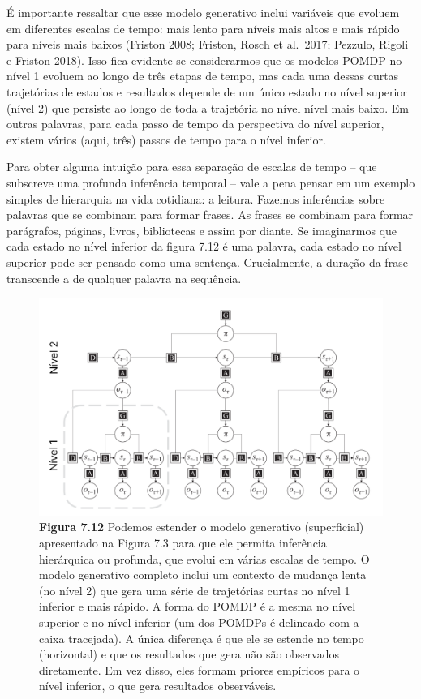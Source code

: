 \documentclass[
  12pt,
]{book}
\begin{document}
É importante ressaltar que esse modelo generativo inclui variáveis que evoluem em diferentes escalas de tempo: mais lento para níveis mais altos e mais rápido para níveis mais baixos (Friston 2008; Friston, Rosch et al.~2017; Pezzulo, Rigoli e Friston 2018). Isso fica evidente se considerarmos que os modelos POMDP no nível 1 evoluem ao longo de três etapas de tempo, mas cada uma dessas curtas trajetórias de estados e resultados depende de um único estado no nível superior (nível 2) que persiste ao longo de toda a trajetória no nível nível mais baixo. Em outras palavras, para cada passo de tempo da perspectiva do nível superior, existem vários (aqui, três) passos de tempo para o nível inferior.

Para obter alguma intuição para essa separação de escalas de tempo -- que subscreve uma profunda inferência temporal -- vale a pena pensar em um exemplo simples de hierarquia na vida cotidiana: a leitura. Fazemos inferências sobre palavras que se combinam para formar frases. As frases se combinam para formar parágrafos, páginas, livros, bibliotecas e assim por diante. Se imaginarmos que cada estado no nível inferior da figura 7.12 é uma palavra, cada estado no nível superior pode ser pensado como uma sentença. Crucialmente, a duração da frase transcende a de qualquer palavra na sequência.

\begin{figure}
\centering
\includegraphics{images/Figura_7_12.png}
\caption{\textbf{Figura 7.12} Podemos estender o modelo generativo (superficial) apresentado na Figura 7.3 para que ele permita inferência hierárquica ou profunda, que evolui em várias escalas de tempo. O modelo generativo completo inclui um contexto de mudança lenta (no nível 2) que gera uma série de trajetórias curtas no nível 1 inferior e mais rápido. A forma do POMDP é a mesma no nível superior e no nível inferior (um dos POMDPs é delineado com a caixa tracejada). A única diferença é que ele se estende no tempo (horizontal) e que os resultados que gera não são observados diretamente. Em vez disso, eles formam priores empíricos para o nível inferior, o que gera resultados observáveis.}
\end{figure}
\end{document}
